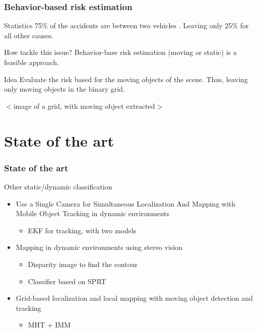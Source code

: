 \documentclass{beamer}
\begin{document}
	\begin{frame}
		\frametitle{Behavior-based risk estimation}
		
		\begin{block}{Statistics}
		75\% of the accidents are between two vehicles \cite{Hurt_1981}. Leaving only 25\% for all other causes.
		\end{block}

		\begin{exampleblock}{How tackle this issue?}
		Behavior-base risk estimation (moving or static) is a feasible approach.
		\end{exampleblock}

		\begin{alertblock}{Idea}
			Evaluate the risk based for the moving objects of the scene. Thus, leaving only moving objects in the binary grid.
		\end{alertblock}

		$<$image of a grid, with moving object extracted$>$

		

	\end{frame}
\section{State of the art}

	\begin{frame}
		\frametitle{State of the art}
		
		\begin{block}{Other static/dynamic classification}
			\begin{itemize}
			\item Use a Single Camera for Simultaneous Localization And Mapping with  Mobile Object Tracking in dynamic environments \cite{Migliore_2009_ICRA}
				\begin{itemize}			
				\item EKF for tracking, with two models				
				\end{itemize}		
			\item Mapping in dynamic environments using stereo vision \cite{DBLP:conf/ivs/LategahnGHKE11}
				\begin{itemize}
				\item Disparity image to find the contour
				\item Classifier based on SPRT				
				\end{itemize}		
			\item Grid-based localization and local mapping with moving object detection and tracking \cite{Vu201158}
				\begin{itemize}			
				\item MHT + IMM			
				\end{itemize}	
			\end{itemize}		
		\end{block}
	\end{frame}
\end{document}

